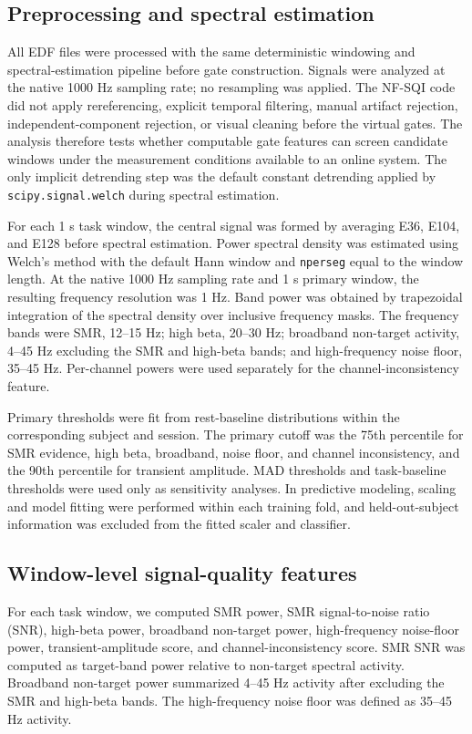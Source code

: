 \documentclass[preprint,12pt]{elsarticle}
\begin{document}
\subsection{Preprocessing and spectral estimation}

All EDF files were processed with the same deterministic windowing and spectral-estimation pipeline before gate construction. Signals were analyzed at the native 1000 Hz sampling rate; no resampling was applied. The NF-SQI code did not apply rereferencing, explicit temporal filtering, manual artifact rejection, independent-component rejection, or visual cleaning before the virtual gates. The analysis therefore tests whether computable gate features can screen candidate windows under the measurement conditions available to an online system. The only implicit detrending step was the default constant detrending applied by \texttt{scipy.signal.welch} during spectral estimation.

For each 1 s task window, the central signal was formed by averaging E36, E104, and E128 before spectral estimation. Power spectral density was estimated using Welch's method with the default Hann window and \texttt{nperseg} equal to the window length. At the native 1000 Hz sampling rate and 1 s primary window, the resulting frequency resolution was 1 Hz. Band power was obtained by trapezoidal integration of the spectral density over inclusive frequency masks. The frequency bands were SMR, 12--15 Hz; high beta, 20--30 Hz; broadband non-target activity, 4--45 Hz excluding the SMR and high-beta bands; and high-frequency noise floor, 35--45 Hz. Per-channel powers were used separately for the channel-inconsistency feature.

Primary thresholds were fit from rest-baseline distributions within the corresponding subject and session. The primary cutoff was the 75th percentile for SMR evidence, high beta, broadband, noise floor, and channel inconsistency, and the 90th percentile for transient amplitude. MAD thresholds and task-baseline thresholds were used only as sensitivity analyses. In predictive modeling, scaling and model fitting were performed within each training fold, and held-out-subject information was excluded from the fitted scaler and classifier.

\subsection{Window-level signal-quality features}

For each task window, we computed SMR power, SMR signal-to-noise ratio (SNR), high-beta power, broadband non-target power, high-frequency noise-floor power, transient-amplitude score, and channel-inconsistency score. SMR SNR was computed as target-band power relative to non-target spectral activity. Broadband non-target power summarized 4--45 Hz activity after excluding the SMR and high-beta bands. The high-frequency noise floor was defined as 35--45 Hz activity.
\end{document}

